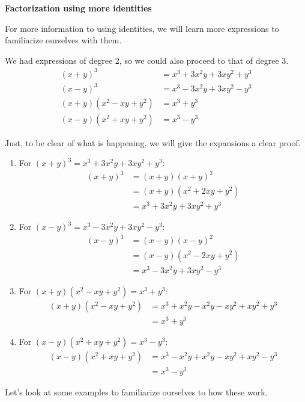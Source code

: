 \documentclass[12pt]{article}
\begin{document}
    \begin{center}
        \textbf{Factorization using more identities}
    \end{center}

    For more information to using identities, we will learn more expressions to familiarize ourselves with them.

    We had expressions of degree 2, so we could also proceed to that of degree 3.\begin{align*}
        (x+y)^3&=x^3+3x^2y+3xy^2+y^3\\
        (x-y)^3&=x^3-3x^2y+3xy^2-y^3\\
        (x+y)(x^2-xy+y^2)&=x^3+y^3\\
        (x-y)(x^2+xy+y^2)&=x^3-y^3
    \end{align*}

    Just, to be clear of what is happening, we will give the expansions a clear proof.\begin{enumerate}
        \item For $(x+y)^3=x^3+3x^2y+3xy^2+y^3$:\begin{align*}
            (x+y)^3&=(x+y)(x+y)^2\\
            &=(x+y)(x^2+2xy+y^2)\\
            &=x^3+3x^2y+3xy^2+y^3
        \end{align*}
        \item For $(x-y)^3=x^3-3x^2y+3xy^2-y^3$:\begin{align*}
            (x-y)^3&=(x-y)(x-y)^2\\
            &=(x-y)(x^2-2xy+y^2)\\
            &=x^3-3x^2y+3xy^2-y^3
        \end{align*}
        \item For $(x+y)(x^2-xy+y^2)=x^3+y^3$:\begin{align*}
            (x+y)(x^2-xy+y^2)&=x^3+x^2y-x^2y-xy^2+xy^2+y^3\\
            &=x^3+y^3
        \end{align*}
        \item For $(x-y)(x^2+xy+y^2)=x^3-y^3$:\begin{align*}
            (x-y)(x^2+xy+y^2)&=x^3-x^2y+x^2y-xy^2+xy^2-y^3\\
            &=x^3-y^3
        \end{align*}
    \end{enumerate}
    
    Let's look at some examples to familiarize ourselves to how these work.
\end{document}
